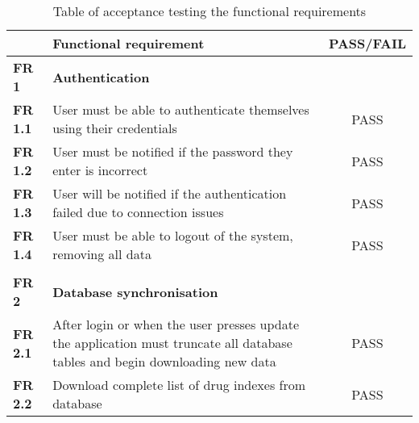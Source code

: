 \begin{center}
\begin{longtable}{| l | p{11cm} | c |}
\caption{Table of acceptance testing the functional requirements}\tabularnewline
\hline
   &	\textbf{Functional requirement} & \textbf{PASS/FAIL}   \\ \hline
\textbf{FR 1}                   & \textbf{Authentication}                                                                                                                                                    &           \\ \hline
\textbf{FR 1.1}                 & User must be able to authenticate themselves using their credentials                                                                                                       & PASS      \\ \hline
\textbf{FR 1.2}                 & User must be notified if the password they enter is incorrect                                                                                                              & PASS      \\ \hline
\textbf{FR 1.3}                 & User will be notified if the authentication failed due to connection issues                                                                                                & PASS      \\ \hline
\textbf{FR 1.4}                 & User must be able to logout of the system, removing all data                                                                                                               & PASS      \\ \hline
\textbf{}                       &                                                                                                                                                                            &           \\ \hline
\textbf{FR 2}                   & \textbf{Database synchronisation}                                                                                                                                          &           \\ \hline
\textbf{FR 2.1}                 & After login or when the user presses update the application must truncate all database tables and begin downloading new data                                               & PASS      \\ \hline
\textbf{FR 2.2}                 & Download complete list of drug indexes from database                                                                                                                       & PASS      \\ \hline

\end{longtable}
\end{center}
